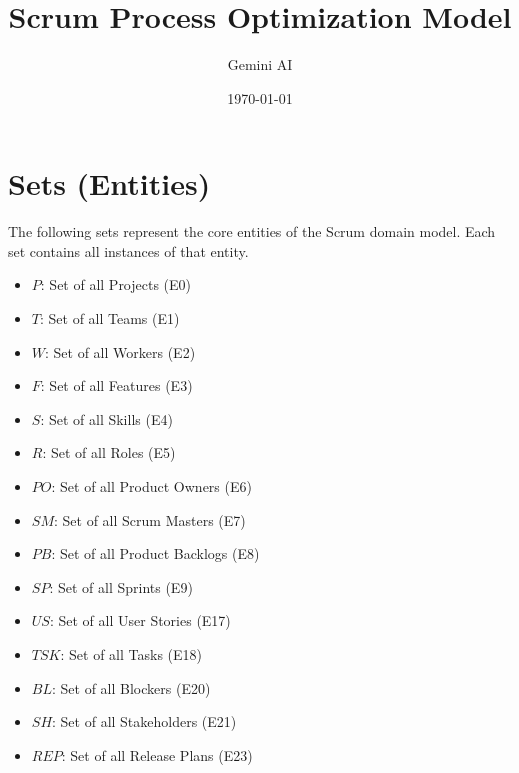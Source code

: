 \documentclass{article}
\title{Scrum Process Optimization Model}
\author{Gemini AI}
\date{\today}
\begin{document}
\maketitle
\tableofcontents
\newpage

\section{Sets (Entities)}
The following sets represent the core entities of the Scrum domain model. Each set contains all instances of that entity.
\begin{itemize}
    \item $P$: Set of all Projects (E0)
    \item $T$: Set of all Teams (E1)
    \item $W$: Set of all Workers (E2)
    \item $F$: Set of all Features (E3)
    \item $S$: Set of all Skills (E4)
    \item $R$: Set of all Roles (E5)
    \item $PO$: Set of all Product Owners (E6)
    \item $SM$: Set of all Scrum Masters (E7)
    \item $PB$: Set of all Product Backlogs (E8)
    \item $SP$: Set of all Sprints (E9)
    \item $US$: Set of all User Stories (E17)
    \item $TSK$: Set of all Tasks (E18)
    \item $BL$: Set of all Blockers (E20)
    \item $SH$: Set of all Stakeholders (E21)
    \item $REP$: Set of all Release Plans (E23)
\end{itemize}
\end{document}
